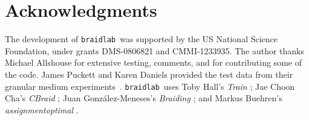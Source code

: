 \documentclass[12pt]{article}
\newcommand{\braidlab}{\texttt{braidlab}}%
\begin{document}
%
%
%
%
%
%


\section*{Acknowledgments}

The development of \braidlab\ was supported by the US National Science
Foundation, under grants DMS-0806821 and CMMI-1233935.  The author
thanks Michael Allshouse for extensive testing, comments, and for
contributing some of the code.  James Puckett and Karen Daniels
provided the test data from their granular medium
experiments~\citep{Puckett2012}.  \braidlab\ uses Toby Hall's
\emph{Train} \citep{HallTrain}; Jae Choon Cha's \emph{CBraid}
\citep{CBraid}; Juan Gonz\'{a}lez-Meneses's \emph{Braiding}
\citep{Braiding}; and Markus Buehren's \emph{assignmentoptimal}
\citep{assignmentoptimal}.





% 
\end{document}
